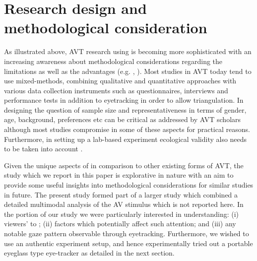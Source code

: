 \documentclass[output=paper]{langsci/langscibook}
\begin{document}
\section{Research design and methodological consideration}

As illustrated above, AVT research using  is becoming more sophisticated with an increasing awareness about methodological considerations regarding the limitations as well as the advantages (e.g. \citealt{perego2012}, \citealt{Kruger2015}). Most  studies in AVT today tend to use mixed-methods, combining qualitative and quantitative approaches with various data collection instruments such as questionnaires, interviews and performance tests in addition to eyetracking in order to allow triangulation. In designing  the question of sample size and representativeness in terms of gender, age, background, preferences etc can be critical as addressed by AVT scholars although most studies compromise in some of these aspects for practical reasons. Furthermore, in setting up a lab-based experiment ecological validity also needs to be taken into account \citep{jakobsen2014}.  


Given the unique aspects of  in comparison to other existing forms of AVT, the  study which we report in this paper is explorative in nature with an aim to provide some useful insights into methodological considerations for similar studies in future. The present study formed part of a larger study which combined a detailed multimodal analysis of the AV stimulus which is not reported here. In the  portion of our study we were particularly interested in understanding: (i) viewers'  to ; (ii) factors which potentially affect such attention; and (iii) any notable gaze pattern observable through eyetracking. Furthermore, we wished to use an authentic experiment setup, and hence experimentally tried out a portable eyeglass type eye-tracker as detailed in the next section. 
\end{document}
